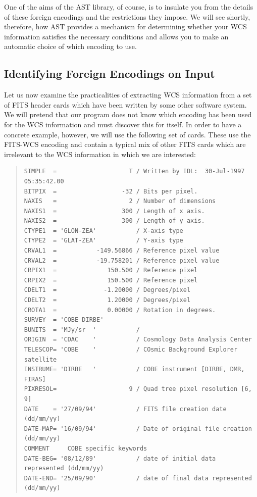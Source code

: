 \documentclass[twoside,11pt]{article}
\begin{document}
One of the aims of the AST library, of course, is to insulate you from
the details of these foreign encodings and the restrictions they
impose. We will see shortly, therefore, how AST provides a mechanism
for determining whether your WCS information satisfies the necessary
conditions and allows you to make an automatic choice of which
encoding to use.

\subsection{\label{ss:identifyingfitsencoding}Identifying Foreign Encodings on Input}

Let us now examine the practicalities of extracting WCS information
from a set of FITS header cards which have been written by some other
software system. We will pretend that our program does not know which
encoding has been used for the WCS information and must discover this
for itself. In order to have a concrete example, however, we will use
the following set of cards. These use the FITS-WCS encoding and
contain a typical mix of other FITS cards which are irrelevant to the
WCS information in which we are interested:

\begin{quote}
\small
\begin{verbatim}
SIMPLE  =                    T / Written by IDL:  30-Jul-1997 05:35:42.00
BITPIX  =                  -32 / Bits per pixel.
NAXIS   =                    2 / Number of dimensions
NAXIS1  =                  300 / Length of x axis.
NAXIS2  =                  300 / Length of y axis.
CTYPE1  = 'GLON-ZEA'           / X-axis type
CTYPE2  = 'GLAT-ZEA'           / Y-axis type
CRVAL1  =           -149.56866 / Reference pixel value
CRVAL2  =           -19.758201 / Reference pixel value
CRPIX1  =              150.500 / Reference pixel
CRPIX2  =              150.500 / Reference pixel
CDELT1  =             -1.20000 / Degrees/pixel
CDELT2  =              1.20000 / Degrees/pixel
CROTA1  =              0.00000 / Rotation in degrees.
SURVEY  = 'COBE DIRBE'
BUNITS  = 'MJy/sr  '           /
ORIGIN  = 'CDAC    '           / Cosmology Data Analysis Center
TELESCOP= 'COBE    '           / COsmic Background Explorer satellite
INSTRUME= 'DIRBE   '           / COBE instrument [DIRBE, DMR, FIRAS]
PIXRESOL=                    9 / Quad tree pixel resolution [6, 9]
DATE    = '27/09/94'           / FITS file creation date (dd/mm/yy)
DATE-MAP= '16/09/94'           / Date of original file creation (dd/mm/yy)
COMMENT     COBE specific keywords
DATE-BEG= '08/12/89'           / date of initial data represented (dd/mm/yy)
DATE-END= '25/09/90'           / date of final data represented   (dd/mm/yy)
\end{verbatim}
\normalsize
\end{quote}
\end{document}
